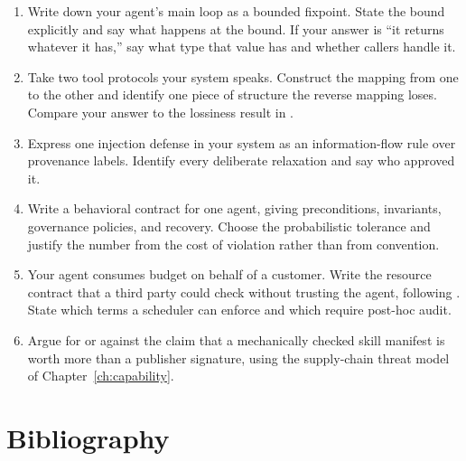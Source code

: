 \begin{enumerate}
\item Write down your agent's main loop as a bounded fixpoint. State the bound
explicitly and say what happens at the bound. If your answer is ``it returns
whatever it has,'' say what type that value has and whether callers handle it.

\item Take two tool protocols your system speaks. Construct the mapping from one
to the other and identify one piece of structure the reverse mapping loses.
Compare your answer to the lossiness result in \cite{toolcalculus2026}.

\item Express one injection defense in your system as an information-flow rule
over provenance labels. Identify every deliberate relaxation and say who
approved it.

\item Write a behavioral contract for one agent, giving preconditions,
invariants, governance policies, and recovery. Choose the probabilistic tolerance
and justify the number from the cost of violation rather than from convention.

\item Your agent consumes budget on behalf of a customer. Write the resource
contract that a third party could check without trusting the agent, following
\cite{resourcecontracts2026}. State which terms a scheduler can enforce and which
require post-hoc audit.

\item Argue for or against the claim that a mechanically checked skill manifest
is worth more than a publisher signature, using the supply-chain threat model of
Chapter~\ref{ch:capability}.
\end{enumerate}

\section*{Bibliography}

